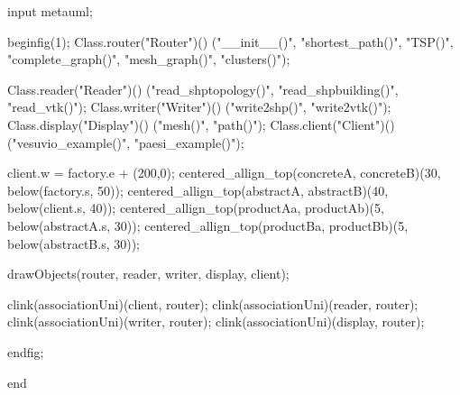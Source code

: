 input metauml;

beginfig(1);
    	Class.router("Router")()
                 ("__init__()", "shortest_path()", "TSP()", "complete_graph()", "mesh_graph()", "clusters()");

    	Class.reader("Reader")()
                   ("read_shptopology()", "read_shpbuilding()", "read_vtk()");
    	Class.writer("Writer")()
                   ("write2shp()", "write2vtk()");
	Class.display("Display")()
                   ("mesh()", "path()");
	Class.client("Client")()
                   ("vesuvio_example()", "paesi_example()");

    client.w = factory.e + (200,0);
    centered_allign_top(concreteA, concreteB)(30, below(factory.s, 50));
    centered_allign_top(abstractA, abstractB)(40, below(client.s, 40));
    centered_allign_top(productAa, productAb)(5,  below(abstractA.s, 30));
    centered_allign_top(productBa, productBb)(5,  below(abstractB.s, 30));

    drawObjects(router, reader, writer, display, client);

    	clink(associationUni)(client, router);
	clink(associationUni)(reader, router);
	clink(associationUni)(writer, router);
	clink(associationUni)(display, router);

endfig;

end
